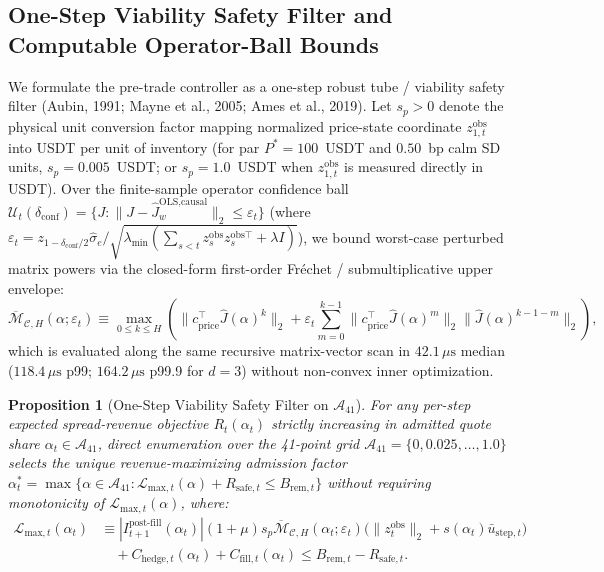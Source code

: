 \documentclass[11pt]{article}
\newtheorem{proposition}[theorem]{Proposition}
\theoremstyle{remark}
\begin{document}
\subsection{One-Step Viability Safety Filter and Computable Operator-Ball Bounds}
We formulate the pre-trade controller as a one-step robust tube / viability safety filter (Aubin, 1991; Mayne et al., 2005; Ames et al., 2019). Let $s_p > 0$ denote the physical unit conversion factor mapping normalized price-state coordinate $z_{1,t}^{\text{obs}}$ into USDT per unit of inventory (for par $P^*=100$~USDT and $0.50$~bp calm SD units, $s_p = 0.005$~USDT; or $s_p = 1.0$~USDT when $z_{1,t}^{\text{obs}}$ is measured directly in USDT). Over the finite-sample operator confidence ball $\mathcal{U}_t(\delta_{\text{conf}}) = \{J : \|J - \hat{J}_w^{\text{OLS,causal}}\|_2 \le \varepsilon_t\}$ (where $\varepsilon_t = z_{1-\delta_{\text{conf}}/2}\hat{\sigma}_e / \sqrt{\lambda_{\min}(\sum_{s<t} z_s^{\text{obs}} z_s^{\text{obs}\top} + \lambda I)}$), we bound worst-case perturbed matrix powers via the closed-form first-order Fr\'echet / submultiplicative upper envelope:
\begin{equation}
\overline{\mathcal{M}}_{\mathcal{C},H}(\alpha; \varepsilon_t) \equiv \max_{0 \le k \le H} \left(\|c_{\text{price}}^\top \hat{J}(\alpha)^k\|_2 + \varepsilon_t \sum_{m=0}^{k-1}\|c_{\text{price}}^\top \hat{J}(\alpha)^m\|_2 \|\hat{J}(\alpha)^{k-1-m}\|_2\right), \label{eq:computable_ball}
\end{equation}
which is evaluated along the same recursive matrix-vector scan in $42.1\,\mu\text{s}$ median ($118.4\,\mu\text{s}$ p99; $164.2\,\mu\text{s}$ p99.9 for $d=3$) without non-convex inner optimization.

\begin{proposition}[One-Step Viability Safety Filter on $\mathcal{A}_{41}$]
For any per-step expected spread-revenue objective $R_t(\alpha_t)$ strictly increasing in admitted quote share $\alpha_t \in \mathcal{A}_{41}$, direct enumeration over the 41-point grid $\mathcal{A}_{41} = \{0, 0.025, \dots, 1.0\}$ selects the unique revenue-maximizing admission factor $\alpha_t^* = \max\{\alpha \in \mathcal{A}_{41} : \mathcal{L}_{\text{max},t}(\alpha) + R_{\text{safe},t} \le B_{\text{rem},t}\}$ without requiring monotonicity of $\mathcal{L}_{\text{max},t}(\alpha)$, where:
\begin{equation}
\begin{aligned}
\mathcal{L}_{\text{max},t}(\alpha_t) &\equiv |I_{t+1}^{\text{post-fill}}(\alpha_t)|(1+\mu)s_p\overline{\mathcal{M}}_{\mathcal{C},H}(\alpha_t;\varepsilon_t)\big(\|z_t^{\text{obs}}\|_2 + s(\alpha_t)\bar{u}_{\text{step},t}\big) \\
&\quad + C_{\text{hedge},t}(\alpha_t) + C_{\text{fill},t}(\alpha_t) \le B_{\text{rem},t} - R_{\text{safe},t}.
\end{aligned} \label{eq:guard_unit_consistent}
\end{equation}
\end{proposition}
\end{document}
